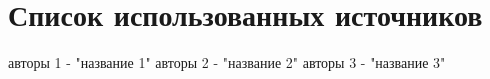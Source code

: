 \section{Список использованных источников}


 
\begin{thebibliography}{}
      авторы 1  -  "название 1"
      авторы 2  -  "название 2"
      авторы 3  -  "название 3"
    \cite{ya.ru}
\end{thebibliography}